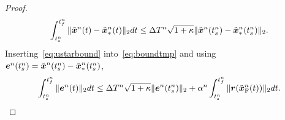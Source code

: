 \begin{proof}
\begin{equation}\label{eq:ustarbound}
\int_{t_s^{n}}^{t_f^{n}} \| \tilde{\boldsymbol x}^{n}(t) - \tilde{\boldsymbol x}_{*}^{n}(t) \|_2 dt 
\le  \Delta T^{n} \sqrt{1 + \kappa} \| \tilde{\boldsymbol x}^{n}(t_s^{n}) - \tilde{\boldsymbol x}_{*}^{n}(t_s^{n} )  \|_2.
\end{equation}
Inserting~\eqref{eq:ustarbound} into~\eqref{eq:boundtmp} and using $\boldsymbol e^{n}(t_s^{n}) = \tilde{\boldsymbol x}^{n}(t_s^{n}) - \tilde{\boldsymbol x}_{*}^{n}(t_s^{n} )$,
\begin{equation*}
\int_{t_s^{n}}^{t_f^{n}} \| \boldsymbol e^{n}(t) \|_2 dt \le \Delta T^{n} \sqrt{1 + \kappa} \|  \boldsymbol e^{n}(t_s^{n})   \|_2   + \alpha^{n} \int_{t_s^{n}}^{t_f^{n}} \|  \boldsymbol r(\tilde{\boldsymbol x}_{\text{F}}^{n}(t))  \|_2 dt.
\end{equation*}
\begin{comment}


\end{comment}
\end{proof}
